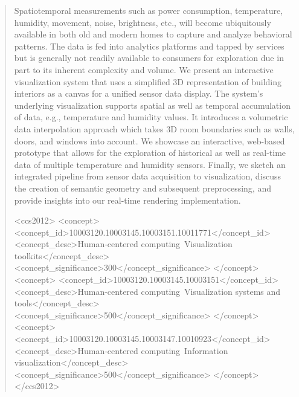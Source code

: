 \documentclass{egpubl}
\begin{document}
\begin{abstract}
    Spatiotemporal measurements such as power consumption, temperature, humidity, movement, noise, brightness, etc., will become ubiquitously available in both old and modern homes to capture and analyze behavioral patterns. 
    The data is fed into analytics platforms and tapped by services but is generally not readily available to consumers for exploration due in part to its inherent complexity and volume. 
    We present an interactive visualization system that uses a simplified 3D representation of building interiors as a canvas for a unified sensor data display. 
    The system’s underlying visualization supports spatial as well as temporal accumulation of data, e.g., temperature and humidity values. 
    It introduces a volumetric data interpolation approach which takes 3D room boundaries such as walls, doors, and windows into account. We showcase an interactive, web-based prototype that allows for the exploration of historical as well as real-time data of multiple temperature and humidity sensors. 
    Finally, we sketch an integrated pipeline from sensor data acquisition to visualization, discuss the creation of semantic geometry and subsequent preprocessing, and provide insights into our real-time rendering implementation.
\begin{CCSXML}
<ccs2012>
   <concept>
       <concept_id>10003120.10003145.10003151.10011771</concept_id>
       <concept_desc>Human-centered computing~Visualization toolkits</concept_desc>
       <concept_significance>300</concept_significance>
       </concept>
   <concept>
       <concept_id>10003120.10003145.10003151</concept_id>
       <concept_desc>Human-centered computing~Visualization systems and tools</concept_desc>
       <concept_significance>500</concept_significance>
       </concept>
   <concept>
       <concept_id>10003120.10003145.10003147.10010923</concept_id>
       <concept_desc>Human-centered computing~Information visualization</concept_desc>
       <concept_significance>500</concept_significance>
       </concept>
 </ccs2012>
\end{CCSXML}
    
    
    \printccsdesc
    
\end{abstract}  
\end{document}
